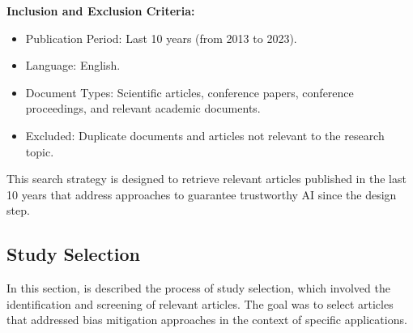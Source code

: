 \documentclass{article}
\begin{document}
\textbf{Inclusion and Exclusion Criteria:}

\begin{itemize}

    \item Publication Period: Last 10 years (from 2013 to 2023).

    \item Language: English.

    \item Document Types: Scientific articles, conference papers, conference proceedings, and relevant academic documents.

    \item Excluded: Duplicate documents and articles not relevant to the research topic.

\end{itemize}

This search strategy is designed to retrieve relevant articles published in the last 10 years that address approaches to guarantee trustworthy AI since the design step.

\subsection{Study Selection}

In this section, is described the process of study selection, which involved the identification and screening of relevant articles. The goal was to select articles that addressed bias mitigation approaches in the context of specific applications.
\end{document}
